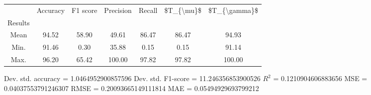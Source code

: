 \begin{tabular}{|c|c|c|c|c|c|c|}
\toprule
{} &  Accuracy &  F1 score &  Precision &  Recall &  \$T\_\{\textbackslash mu\}\$ &  \$T\_\{\textbackslash gamma\}\$ \\
Results &           &           &            &         &            &               \\
\hline
Mean    &     94.52 &     58.90 &      49.61 &   86.47 &      86.47 &         94.93 \\
Min.    &     91.46 &      0.30 &      35.88 &    0.15 &       0.15 &         91.14 \\
Max.    &     96.20 &     65.42 &     100.00 &   97.82 &      97.82 &        100.00 \\
\bottomrule
\end{tabular}

 Dev. std. accuracy = 1.0464952900857596
 Dev. std. F1-score = 11.246356853900526
 $R^2$ = 0.1210904606883656
 MSE = 0.04037553791246307
 RMSE = 0.20093665149111814
 MAE = 0.05494929693799212